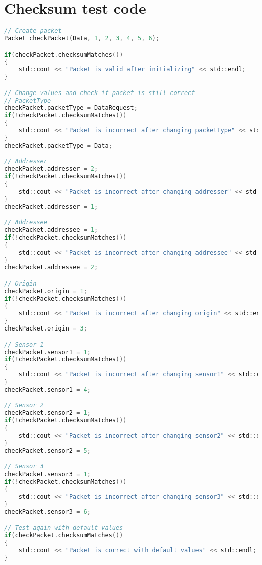 \chapter{Checksum test code} \label{cha:checksumtest}
\begin{lstlisting}[language=C]
// Create packet
Packet checkPacket(Data, 1, 2, 3, 4, 5, 6);

if(checkPacket.checksumMatches())
{
    std::cout << "Packet is valid after initializing" << std::endl;
}

// Change values and check if packet is still correct
// PacketType
checkPacket.packetType = DataRequest;
if(!checkPacket.checksumMatches())
{
    std::cout << "Packet is incorrect after changing packetType" << std::endl;
}
checkPacket.packetType = Data;

// Addresser
checkPacket.addresser = 2;
if(!checkPacket.checksumMatches())
{
    std::cout << "Packet is incorrect after changing addresser" << std::endl;
}
checkPacket.addresser = 1;

// Addressee
checkPacket.addressee = 1;
if(!checkPacket.checksumMatches())
{
    std::cout << "Packet is incorrect after changing addressee" << std::endl;
}
checkPacket.addressee = 2;

// Origin
checkPacket.origin = 1;
if(!checkPacket.checksumMatches())
{
    std::cout << "Packet is incorrect after changing origin" << std::endl;
}
checkPacket.origin = 3;

// Sensor 1
checkPacket.sensor1 = 1;
if(!checkPacket.checksumMatches())
{
    std::cout << "Packet is incorrect after changing sensor1" << std::endl;
}
checkPacket.sensor1 = 4;

// Sensor 2
checkPacket.sensor2 = 1;
if(!checkPacket.checksumMatches())
{
    std::cout << "Packet is incorrect after changing sensor2" << std::endl;
}
checkPacket.sensor2 = 5;

// Sensor 3
checkPacket.sensor3 = 1;
if(!checkPacket.checksumMatches())
{
    std::cout << "Packet is incorrect after changing sensor3" << std::endl;
}
checkPacket.sensor3 = 6;

// Test again with default values
if(checkPacket.checksumMatches())
{
    std::cout << "Packet is correct with default values" << std::endl;
}
\end{lstlisting}
